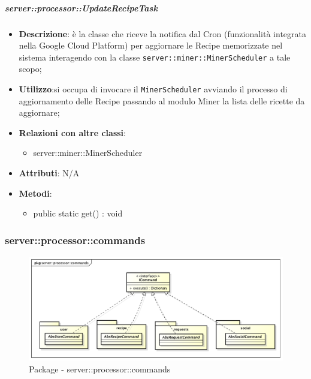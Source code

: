     \subparagraph{server::processor::UpdateRecipeTask} %
    \label{subp:bdsm_app_server_processor_updaterecipetask}
    \begin{itemize}
      \item \textbf{Descrizione}: è la classe che riceve la notifica dal Cron (funzionalità integrata nella Google Cloud Platform) per aggiornare le Recipe memorizzate nel sistema interagendo con la classe \texttt{server::miner::MinerScheduler} a tale scopo;
      \item \textbf{Utilizzo}:si occupa di invocare il \texttt{MinerScheduler} avviando il processo di aggiornamento delle Recipe passando al modulo Miner la lista delle ricette da aggiornare;
      \item \textbf{Relazioni con altre classi}:
        \begin{itemize}
          \item server::miner::MinerScheduler
        \end{itemize}
		\item \textbf{Attributi}: N/A
		\item \textbf{Metodi}:
        	\begin{itemize}
          		\item public static get() : void
        	\end{itemize}
    \end{itemize}


    \subsubsection{server::processor::commands} %
    \label{ssub:bdsm_app_server_processor_commands}
    \begin{figure}[!htbp]
    	\centering
    	\centerline{\includegraphics[scale=0.4]{./images/server/commands.pdf}}
    	\caption{Package - server::processor::commands}
    \end{figure}

